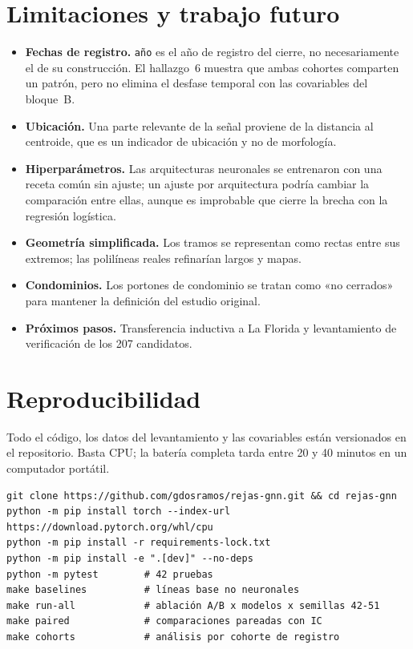 \documentclass[11pt,a4paper]{article}
\newcommand{\codigo}[1]{\texttt{#1}}
\begin{document}
\section{Limitaciones y trabajo futuro}
\label{sec:limites}

\begin{itemize}[leftmargin=*]
  \item \textbf{Fechas de registro.} \codigo{año} es el año de registro del cierre, no
    necesariamente el de su construcción. El hallazgo~6 muestra que ambas cohortes comparten un
    patrón, pero no elimina el desfase temporal con las covariables del bloque~B.
  \item \textbf{Ubicación.} Una parte relevante de la señal proviene de la distancia al centroide,
    que es un indicador de ubicación y no de morfología.
  \item \textbf{Hiperparámetros.} Las arquitecturas neuronales se entrenaron con una receta común
    sin ajuste; un ajuste por arquitectura podría cambiar la comparación entre ellas, aunque es
    improbable que cierre la brecha con la regresión logística.
  \item \textbf{Geometría simplificada.} Los tramos se representan como rectas entre sus extremos;
    las polilíneas reales refinarían largos y mapas.
  \item \textbf{Condominios.} Los portones de condominio se tratan como «no cerrados» para mantener
    la definición del estudio original.
  \item \textbf{Próximos pasos.} Transferencia inductiva a La Florida y levantamiento de
    verificación de los 207 candidatos.
\end{itemize}

\section{Reproducibilidad}

Todo el código, los datos del levantamiento y las covariables están versionados en el repositorio.
Basta CPU; la batería completa tarda entre 20 y 40 minutos en un computador portátil.

\begin{verbatim}
git clone https://github.com/gdosramos/rejas-gnn.git && cd rejas-gnn
python -m pip install torch --index-url https://download.pytorch.org/whl/cpu
python -m pip install -r requirements-lock.txt
python -m pip install -e ".[dev]" --no-deps
python -m pytest        # 42 pruebas
make baselines          # líneas base no neuronales
make run-all            # ablación A/B x modelos x semillas 42-51
make paired             # comparaciones pareadas con IC
make cohorts            # análisis por cohorte de registro
\end{verbatim}
\end{document}
